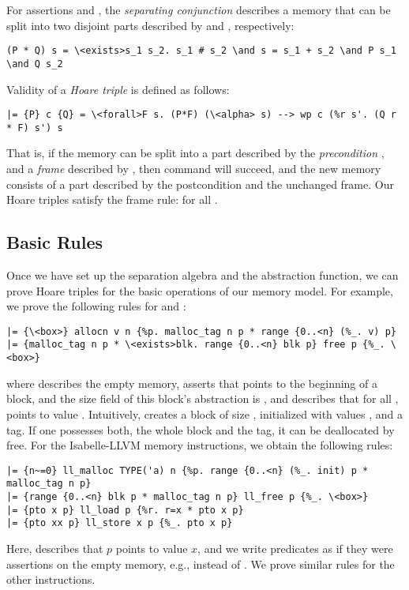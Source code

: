 \documentclass[a4paper,USenglish,cleveref, autoref]{lipics-v2019}
\begin{document}
For assertions  and , the \emph{separating conjunction}  describes a memory that can be split into two disjoint parts described by  and , respectively:
\begin{lstlisting}
(P * Q) s = \<exists>s_1 s_2. s_1 # s_2 \and s = s_1 + s_2 \and P s_1 \and Q s_2
\end{lstlisting}
%
Validity of a \emph{Hoare triple}  is defined as follows:
\begin{lstlisting}
|= {P} c {Q} = \<forall>F s. (P*F) (\<alpha> s) --> wp c (%r s'. (Q r * F) s') s
\end{lstlisting}
That is, if the memory can be split into a part described by the \emph{precondition} , and a \emph{frame} described by ,
then command  will succeed, and the new memory consists of a part described by the postcondition  and the unchanged frame. 
Our Hoare triples satisfy the frame rule:  for all .

\subsection{Basic Rules}
Once we have set up the separation algebra and the abstraction function, we can prove Hoare triples for the basic operations of our memory model.
For example, we prove the following rules for  and :
\begin{lstlisting}
|= {\<box>} allocn v n {%p. malloc_tag n p * range {0..<n} (%_. v) p}
|= {malloc_tag n p * \<exists>blk. range {0..<n} blk p} free p {%_. \<box>}
\end{lstlisting}
where  describes the empty memory, 
 asserts that  points to the beginning of a block, and the size field of this block's abstraction is , 
and  describes that for all ,  points to value .
Intuitively,  creates a block of size , initialized with values , and a tag. 
If one possesses both, the whole block and the tag, it can be deallocated by free. 
For the Isabelle-LLVM memory instructions, we obtain the following rules:
\begin{lstlisting}
|= {n~=0} ll_malloc TYPE('a) n {%p. range {0..<n} (%_. init) p * malloc_tag n p}
|= {range {0..<n} blk p * malloc_tag n p} ll_free p {%_. \<box>}
|= {pto x p} ll_load p {%r. r=x * pto x p}
|= {pto xx p} ll_store x p {%_. pto x p}
\end{lstlisting}
Here,  describes that $p$ points to value $x$, and we write predicates as if they were assertions 
on the empty memory, e.g.,  instead of .
We prove similar rules for the other instructions.
\end{document}
